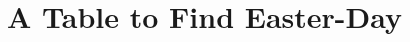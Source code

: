 \newcommand \Sol[1]{{\versiculus☉}~in~{\versiculus#1}}
\newcommand \dub[1]{{\footnotesize\sffamily #1}}		%
\newcommand \mem[1]{\emph{#1}} %




\newpage

\section*{A Table to Find Easter-Day}
